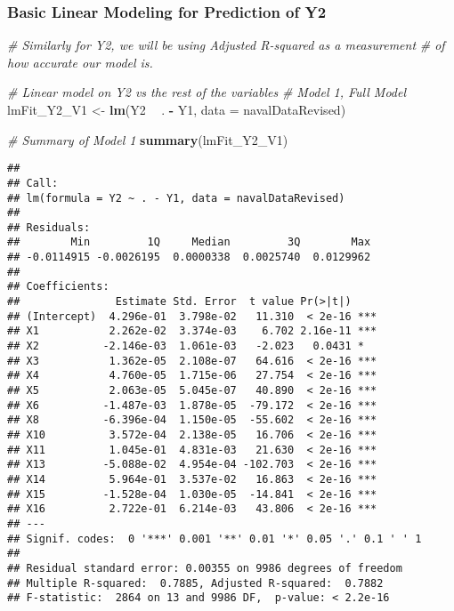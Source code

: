 \documentclass[
]{article}
\newenvironment{Shaded}{\begin{snugshade}}{\end{snugshade}}
\newcommand{\CommentTok}[1]{\textcolor[rgb]{0.56,0.35,0.01}{\textit{#1}}}
\newcommand{\DataTypeTok}[1]{\textcolor[rgb]{0.13,0.29,0.53}{#1}}
\newcommand{\KeywordTok}[1]{\textcolor[rgb]{0.13,0.29,0.53}{\textbf{#1}}}
\newcommand{\NormalTok}[1]{#1}
\newcommand{\OperatorTok}[1]{\textcolor[rgb]{0.81,0.36,0.00}{\textbf{#1}}}
\newcommand{\StringTok}[1]{\textcolor[rgb]{0.31,0.60,0.02}{#1}}
\begin{document}
\hypertarget{basic-linear-modeling-for-prediction-of-y2}{%
\subsubsection{Basic Linear Modeling for Prediction of
Y2}\label{basic-linear-modeling-for-prediction-of-y2}}

\begin{Shaded}
\begin{Highlighting}[]
\CommentTok{# Similarly for Y2, we will be using Adjusted R-squared as a measurement}
\CommentTok{# of how accurate our model is.}

\CommentTok{# Linear model on Y2 vs the rest of the variables}
\CommentTok{# Model 1, Full Model}
\NormalTok{lmFit_Y2_V1 <-}\StringTok{ }\KeywordTok{lm}\NormalTok{(Y2 }\OperatorTok{~}\StringTok{ }\NormalTok{. }\OperatorTok{-}\StringTok{ }\NormalTok{Y1, }\DataTypeTok{data =}\NormalTok{ navalDataRevised)}

\CommentTok{# Summary of Model 1}
\KeywordTok{summary}\NormalTok{(lmFit_Y2_V1)}
\end{Highlighting}
\end{Shaded}

\begin{verbatim}
## 
## Call:
## lm(formula = Y2 ~ . - Y1, data = navalDataRevised)
## 
## Residuals:
##        Min         1Q     Median         3Q        Max 
## -0.0114915 -0.0026195  0.0000338  0.0025740  0.0129962 
## 
## Coefficients:
##               Estimate Std. Error  t value Pr(>|t|)    
## (Intercept)  4.296e-01  3.798e-02   11.310  < 2e-16 ***
## X1           2.262e-02  3.374e-03    6.702 2.16e-11 ***
## X2          -2.146e-03  1.061e-03   -2.023   0.0431 *  
## X3           1.362e-05  2.108e-07   64.616  < 2e-16 ***
## X4           4.760e-05  1.715e-06   27.754  < 2e-16 ***
## X5           2.063e-05  5.045e-07   40.890  < 2e-16 ***
## X6          -1.487e-03  1.878e-05  -79.172  < 2e-16 ***
## X8          -6.396e-04  1.150e-05  -55.602  < 2e-16 ***
## X10          3.572e-04  2.138e-05   16.706  < 2e-16 ***
## X11          1.045e-01  4.831e-03   21.630  < 2e-16 ***
## X13         -5.088e-02  4.954e-04 -102.703  < 2e-16 ***
## X14          5.964e-01  3.537e-02   16.863  < 2e-16 ***
## X15         -1.528e-04  1.030e-05  -14.841  < 2e-16 ***
## X16          2.722e-01  6.214e-03   43.806  < 2e-16 ***
## ---
## Signif. codes:  0 '***' 0.001 '**' 0.01 '*' 0.05 '.' 0.1 ' ' 1
## 
## Residual standard error: 0.00355 on 9986 degrees of freedom
## Multiple R-squared:  0.7885, Adjusted R-squared:  0.7882 
## F-statistic:  2864 on 13 and 9986 DF,  p-value: < 2.2e-16
\end{verbatim}
\end{document}
